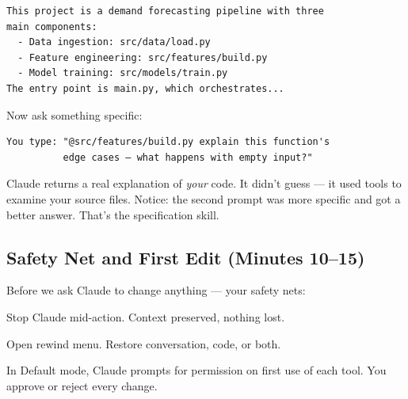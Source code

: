 \documentclass[10pt,oneside]{scrartcl}
\begin{document}

\begin{verbatim}
This project is a demand forecasting pipeline with three
main components:
  - Data ingestion: src/data/load.py
  - Feature engineering: src/features/build.py
  - Model training: src/models/train.py
The entry point is main.py, which orchestrates...
\end{verbatim}

Now ask something specific:

\begin{verbatim}
You type: "@src/features/build.py explain this function's
          edge cases — what happens with empty input?"
\end{verbatim}


Claude returns a real explanation of \emph{your} code. It didn't guess --- it used tools to examine your source files. Notice: the second prompt was more specific and got a better answer. That's the specification skill.

\subsection{Safety Net and First Edit (Minutes 10--15)}

Before we ask Claude to change anything --- your safety nets:

\begin{keybox}
\begin{description}[leftmargin=2.2cm, style=sameline, font=\bfseries\ttfamily, itemsep=2pt]
  \item[Esc] Stop Claude mid-action. Context preserved, nothing lost.
  \item[Esc+Esc] Open rewind menu. Restore conversation, code, or both.
  \item[Approval] In Default mode, Claude prompts for permission on first use of each tool. You approve or reject every change.
\end{description}
\end{keybox}

\end{document}
